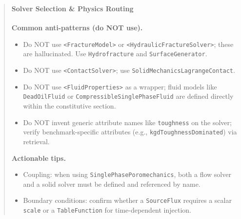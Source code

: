 \documentclass{article}
\begin{document}
\begin{quote}\small
\textbf{Solver Selection \& Physics Routing}\\[2pt]
\noindent{}
\\[6pt]
\textbf{Common anti-patterns (do NOT use).}\\
\begin{itemize}
\item Do NOT use \texttt{<FractureModel>} or \texttt{<HydraulicFractureSolver>}; these are hallucinated. Use \texttt{Hydrofracture} and \texttt{SurfaceGenerator}.
\item Do NOT use \texttt{<ContactSolver>}; use \texttt{SolidMechanicsLagrangeContact}.
\item Do NOT use \texttt{<FluidProperties>} as a wrapper; fluid models like \texttt{DeadOilFluid} or \texttt{CompressibleSinglePhaseFluid} are defined directly within the constitutive section.
\item Do NOT invent generic attribute names like \texttt{toughness} on the solver; verify benchmark-specific attributes (e.g., \texttt{kgdToughnessDominated}) via retrieval.
\end{itemize}
\textbf{Actionable tips.}\\
\begin{itemize}
\item Coupling: when using \texttt{SinglePhasePoromechanics}, both a flow solver and a solid solver must be defined and referenced by name.
\item Boundary conditions: confirm whether a \texttt{SourceFlux} requires a scalar \texttt{scale} or a \texttt{TableFunction} for time-dependent injection.
\end{itemize}
\end{quote}
\end{document}
